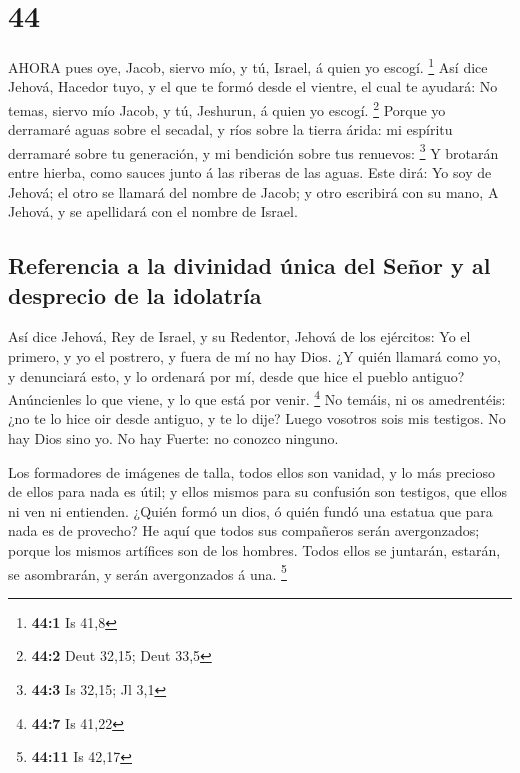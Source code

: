 \hypertarget{section-43}{%
\section{44}\label{section-43}}

 AHORA pues oye, Jacob, siervo mío, y tú, Israel, á quien yo
escogí. \footnote{\textbf{44:1} Is 41,8}  Así dice Jehová,
Hacedor tuyo, y el que te formó desde el vientre, el cual te ayudará: No
temas, siervo mío Jacob, y tú, Jeshurun, á quien yo escogí. \footnote{\textbf{44:2}
  Deut 32,15; Deut 33,5}  Porque yo derramaré aguas sobre el
secadal, y ríos sobre la tierra árida: mi espíritu derramaré sobre tu
generación, y mi bendición sobre tus renuevos: \footnote{\textbf{44:3}
  Is 32,15; Jl 3,1}  Y brotarán entre hierba, como sauces
junto á las riberas de las aguas.  Este dirá: Yo soy de
Jehová; el otro se llamará del nombre de Jacob; y otro escribirá con su
mano, A Jehová, y se apellidará con el nombre de Israel.

\hypertarget{referencia-a-la-divinidad-uxfanica-del-seuxf1or-y-al-desprecio-de-la-idolatruxeda}{%
\subsection{Referencia a la divinidad única del Señor y al desprecio de
la
idolatría}\label{referencia-a-la-divinidad-uxfanica-del-seuxf1or-y-al-desprecio-de-la-idolatruxeda}}

 Así dice Jehová, Rey de Israel, y su Redentor, Jehová de
los ejércitos: Yo el primero, y yo el postrero, y fuera de mí no hay
Dios.  ¿Y quién llamará como yo, y denunciará esto, y lo
ordenará por mí, desde que hice el pueblo antiguo? Anúncienles lo que
viene, y lo que está por venir. \footnote{\textbf{44:7} Is 41,22}
 No temáis, ni os amedrentéis: ¿no te lo hice oir desde
antiguo, y te lo dije? Luego vosotros sois mis testigos. No hay Dios
sino yo. No hay Fuerte: no conozco ninguno.

 Los formadores de imágenes de talla, todos ellos son
vanidad, y lo más precioso de ellos para nada es útil; y ellos mismos
para su confusión son testigos, que ellos ni ven ni entienden.
 ¿Quién formó un dios, ó quién fundó una estatua que para
nada es de provecho?  He aquí que todos sus compañeros
serán avergonzados; porque los mismos artífices son de los hombres.
Todos ellos se juntarán, estarán, se asombrarán, y serán avergonzados á
una. \footnote{\textbf{44:11} Is 42,17}

